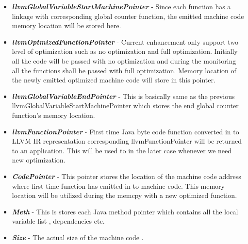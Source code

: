 \begin{itemize}
  \item \emph{\textbf{llvmGlobalVariableStartMachinePointer}}  - Since each function has a linkage with corresponding global counter function, the emitted machine code memory location will be stored here.
  \item \emph{\textbf{llvmOptmizedFunctionPointer}} - Current enhancement only support two level of optimization such as no optimization and full optimization. Initially all the code will be passed with no optimization and during the monitoring all the functions shall be passed with full optimization. Memory location of the newly emitted optimized machine code will store in this pointer.
  \item \emph{\textbf{llvmGlobalVariableEndPointer}} - This is basically same as the previous llvmGlobalVariableStartMachinePointer which stores the end global counter function's memory location.
  \item \emph{\textbf{llvmFunctionPointer}}  -  First time Java byte code function converted in to LLVM IR representation corresponding llvmFunctionPointer will be returned to an application. This will be used to in the later case whenever we need new optimization.
  \item \emph{\textbf{CodePointer}}  -  This pointer stores the location of the machine code address where first time function has emitted in to machine code. This memory location will be utilized during the memcpy with a new optimized function.
  \item \emph{\textbf{Meth}}  - This is stores each Java method pointer which contains all the local variable list , dependencies etc.
  \item \emph{\textbf{Size}} -  The actual size of the machine code .
\end{itemize}


